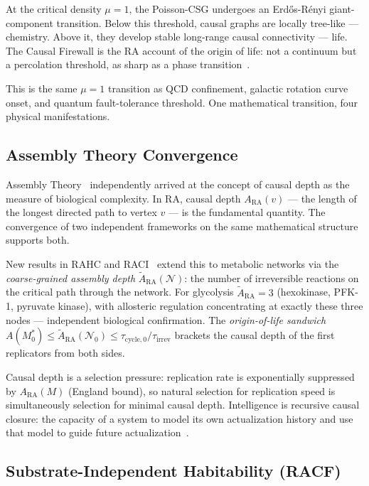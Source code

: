 \documentclass[11pt,a4paper]{article}
\begin{document}
At the critical density $\mu = 1$, the Poisson-CSG undergoes an
Erd\H{o}s-R\'{e}nyi giant-component transition. Below this threshold,
causal graphs are locally tree-like --- chemistry. Above it, they develop
stable long-range causal connectivity --- life. The Causal Firewall is
the RA account of the origin of life: not a continuum but a percolation
threshold, as sharp as a phase transition~\citep{Sandeman2026RACI}.

This is the same $\mu = 1$ transition as QCD confinement, galactic
rotation curve onset, and quantum fault-tolerance threshold. One
mathematical transition, four physical manifestations.

\subsection{Assembly Theory Convergence}

Assembly Theory~\citep{Walker2023} independently arrived at
the concept of causal depth as the measure of biological complexity.
In RA, causal depth $A_{\mathrm{RA}}(v)$ --- the length of the longest
directed path to vertex $v$ --- is the fundamental quantity. The
convergence of two independent frameworks on the same mathematical
structure supports both.


New results in RAHC and RACI~\citep{Sandeman2026RAHC,Sandeman2026RACI}
extend this to metabolic networks via the \emph{coarse-grained assembly
depth} $\tilde{A}_{\mathrm{RA}}(\mathcal{N})$: the number of irreversible
reactions on the critical path through the network. For glycolysis
$\tilde{A}_{\mathrm{RA}} = 3$ (hexokinase, PFK-1, pyruvate kinase),
with allosteric regulation concentrating at exactly these three nodes ---
independent biological confirmation. The \emph{origin-of-life sandwich}
$A(M^*_0) \leq \tilde{A}_{\mathrm{RA}}(\mathcal{N}_0) \leq
\tau_{\mathrm{cycle},0}/\tau_{\mathrm{irrev}}$
brackets the causal depth of the first replicators from both sides.


Causal depth is a selection pressure: replication rate is exponentially
suppressed by $A_{\mathrm{RA}}(M)$ (England bound), so natural selection
for replication speed is simultaneously selection for minimal causal depth.
Intelligence is recursive causal closure: the capacity of a system to
model its own actualization history and use that model to guide future
actualization~\citep{Sandeman2026RAHC}.

\subsection{Substrate-Independent Habitability (RACF)}
\end{document}
